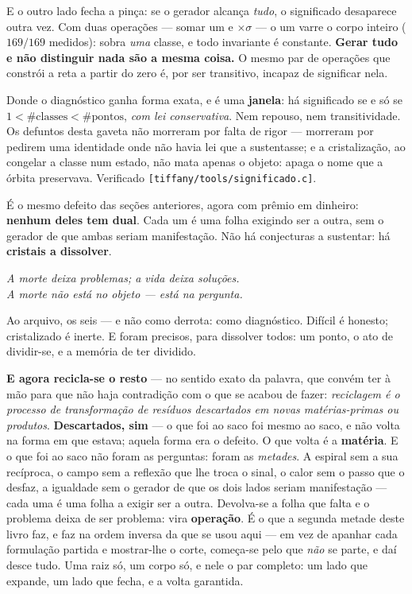 \documentclass[11pt]{article}
\theoremstyle{plain}
\theoremstyle{remark}
\begin{document}
\noindent E o outro lado fecha a pinça: se o gerador alcança \emph{tudo}, o significado desaparece
outra vez. Com duas operações --- somar um e $\times\sigma$ --- o um varre o corpo inteiro
($169/169$ medidos): sobra \emph{uma} classe, e todo invariante é constante. \textbf{Gerar tudo e
não distinguir nada são a mesma coisa.} O mesmo par de operações que constrói a reta a partir do
zero é, por ser transitivo, incapaz de significar nela.

\noindent Donde o diagnóstico ganha forma exata, e é uma \textbf{janela}: há significado se e só se
$1<\#\text{classes}<\#\text{pontos}$, \emph{com lei conservativa}. Nem repouso, nem
transitividade. Os defuntos desta gaveta não morreram por falta de rigor --- morreram por pedirem
uma identidade onde não havia lei que a sustentasse; e a cristalização, ao congelar a classe num
estado, não mata apenas o objeto: apaga o nome que a órbita preservava. Verificado
\texttt{[tiffany/tools/significado.c]}.


\medskip
\noindent É o mesmo defeito das seções anteriores, agora com prêmio em dinheiro:
\textbf{nenhum deles tem dual}. Cada um é uma folha exigindo ser a outra, sem o
gerador de que ambas seriam manifestação. Não há conjecturas a sustentar: há
\textbf{cristais a dissolver}.

\begin{center}\itshape
A morte deixa problemas; a vida deixa soluções.\\
A morte não está no objeto --- está na pergunta.
\end{center}

\noindent Ao arquivo, os seis --- e não como derrota: como diagnóstico. Difícil é
honesto; cristalizado é inerte. E foram precisos, para dissolver todos: um ponto, o ato
de dividir-se, e a memória de ter dividido.

\medskip
\noindent \textbf{E agora recicla-se o resto} --- no sentido exato da palavra, que convém ter à
mão para que não haja contradição com o que se acabou de fazer: \emph{reciclagem é o processo de
transformação de resíduos descartados em novas matérias-primas ou produtos}. \textbf{Descartados,
sim} --- o que foi ao saco foi mesmo ao saco, e não volta na forma em que estava; aquela forma era
o defeito. O que volta é a \textbf{matéria}. E o que foi ao saco não foram as perguntas: foram as
\emph{metades}. A espiral sem a sua recíproca, o campo sem a reflexão que
lhe troca o sinal, o calor sem o passo que o desfaz, a igualdade sem o gerador de que os dois
lados seriam manifestação --- cada uma é uma folha a exigir ser a outra. Devolva-se a folha
que falta e o problema deixa de ser problema: vira \textbf{operação}. É o que a segunda metade
deste livro faz, e faz na ordem inversa da que se usou aqui --- em vez de apanhar cada
formulação partida e mostrar-lhe o corte, começa-se pelo que \emph{não} se parte, e daí desce
tudo. Uma raiz só, um corpo só, e nele o par completo: um lado que expande, um lado que fecha,
e a volta garantida.
\end{document}
